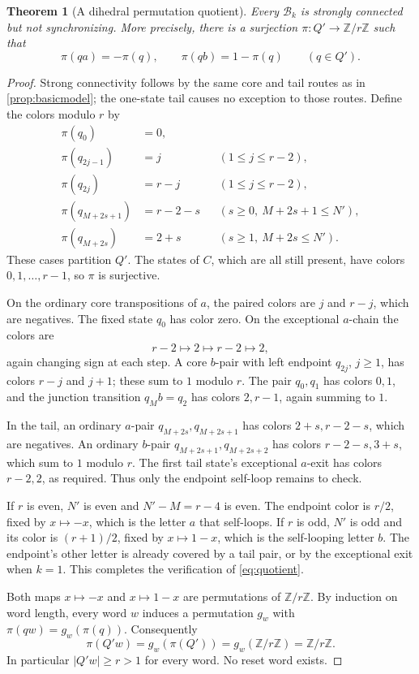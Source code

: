 \documentclass[11pt,a4paper]{article}
\numberwithin{equation}{section}
\newtheorem{theorem}{Theorem}[section]
\theoremstyle{definition}
\theoremstyle{remark}
\newcommand{\Bk}{\mathcal B_k}
\newcommand{\Zr}{\mathbb Z/r\mathbb Z}
\begin{document}
\begin{theorem}[A dihedral permutation quotient]\label{thm:obstruction}
Every $\Bk$ is strongly connected but not synchronizing. More precisely,
there is a surjection $\pi:Q'\to\Zr$ such that
\begin{equation}\label{eq:quotient}
 \pi(q a)=-\pi(q),\qquad \pi(q b)=1-\pi(q)
 \qquad(q\in Q').
\end{equation}
\end{theorem}
\begin{proof}
Strong connectivity follows by the same core and tail routes as in
\cref{prop:basicmodel}; the one-state tail causes no exception to those
routes. Define the colors modulo $r$ by
\begin{equation}\label{eq:colours}
\begin{aligned}
 \pi(q_0)&=0,\\
 \pi(q_{2j-1})&=j &&(1\leq j\leq r-2),\\
 \pi(q_{2j})&=r-j &&(1\leq j\leq r-2),\\
 \pi(q_{M+2s+1})&=r-2-s &&(s\geq0,\ M+2s+1\leq N'),\\
 \pi(q_{M+2s})&=2+s &&(s\geq1,\ M+2s\leq N').
\end{aligned}
\end{equation}
These cases partition $Q'$. The states of $C$, which are all still present,
have colors $0,1,\ldots,r-1$, so $\pi$ is surjective.

On the ordinary core transpositions of $a$, the paired colors are $j$ and
$r-j$, which are negatives. The fixed state $q_0$ has color zero. On the
exceptional $a$-chain the colors are
\[
 r-2\longmapsto2\longmapsto r-2\longmapsto2,
\]
again changing sign at each step. A core $b$-pair with left endpoint
$q_{2j}$, $j\geq1$, has colors $r-j$ and $j+1$; these sum to $1$ modulo
$r$. The pair $q_0,q_1$ has colors $0,1$, and the junction transition
$q_Mb=q_2$ has colors $2,r-1$, again summing to $1$.

In the tail, an ordinary $a$-pair $q_{M+2s},q_{M+2s+1}$ has colors
$2+s,r-2-s$, which are negatives. An ordinary $b$-pair
$q_{M+2s+1},q_{M+2s+2}$ has colors $r-2-s,3+s$, which sum to $1$ modulo
$r$. The first tail state's exceptional $a$-exit has colors $r-2,2$,
as required. Thus only the endpoint self-loop remains to check.

If $r$ is even, $N'$ is even and $N'-M=r-4$ is even. The endpoint color
is $r/2$, fixed by $x\mapsto-x$, which is the letter $a$ that self-loops.
If $r$ is odd, $N'$ is odd and its color is $(r+1)/2$, fixed by
$x\mapsto1-x$, which is the self-looping letter $b$. The endpoint's other
letter is already covered by a tail pair, or by the exceptional exit when
$k=1$. This completes the verification of \eqref{eq:quotient}.

Both maps $x\mapsto-x$ and $x\mapsto1-x$ are permutations of $\Zr$.
By induction on word length, every word $w$ induces a permutation $g_w$
with $\pi(qw)=g_w(\pi(q))$. Consequently
\[
 \pi(Q'w)=g_w(\pi(Q'))=g_w(\Zr)=\Zr.
\]
In particular $|Q'w|\geq r>1$ for every word. No reset word exists.
\end{proof}
\end{document}
